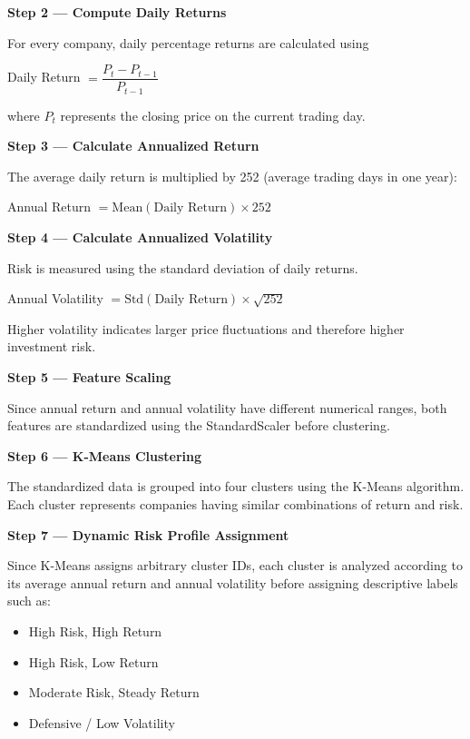 \documentclass[14pt,a4paper]{extreport}
\begin{document}
\noindent\textbf{Step 2 --- Compute Daily Returns}

For every company, daily percentage returns are calculated using

\begin{center}
Daily Return $= \dfrac{P_t - P_{t-1}}{P_{t-1}}$
\end{center}

where $P_t$ represents the closing price on the current trading day.

\noindent\textbf{Step 3 --- Calculate Annualized Return}

The average daily return is multiplied by 252 (average trading days in
one year):

\begin{center}
Annual Return $= \text{Mean}(\text{Daily Return}) \times 252$
\end{center}

\noindent\textbf{Step 4 --- Calculate Annualized Volatility}

Risk is measured using the standard deviation of daily returns.

\begin{center}
Annual Volatility $= \text{Std}(\text{Daily Return}) \times \sqrt{252}$
\end{center}

Higher volatility indicates larger price fluctuations and therefore
higher investment risk.

\noindent\textbf{Step 5 --- Feature Scaling}

Since annual return and annual volatility have different numerical
ranges, both features are standardized using the StandardScaler before
clustering.

\noindent\textbf{Step 6 --- K-Means Clustering}

The standardized data is grouped into four clusters using the K-Means
algorithm. Each cluster represents companies having similar combinations
of return and risk.

\noindent\textbf{Step 7 --- Dynamic Risk Profile Assignment}

Since K-Means assigns arbitrary cluster IDs, each cluster is analyzed
according to its average annual return and annual volatility before
assigning descriptive labels such as:

\begin{itemize}
    \item High Risk, High Return
    \item High Risk, Low Return
    \item Moderate Risk, Steady Return
    \item Defensive / Low Volatility
\end{itemize}
\end{document}
